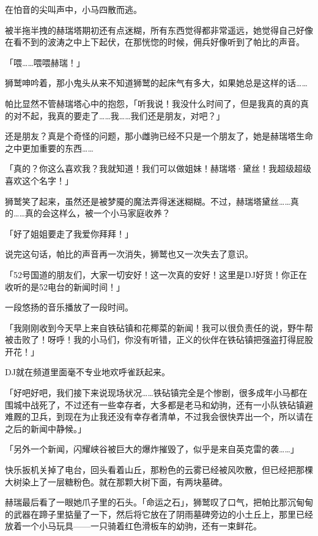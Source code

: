 在怕音的尖叫声中，小马四散而逃。

被半拖半拽的赫瑞塔期初还有点迷糊，所有东西觉得都非常遥远，她觉得自己好像在看不到的波涛之中上下起伏，在那恍惚的时候，佣兵好像听到了帕比的声音。

「喂……喂喂赫瑞！」

狮鹫呻吟着，那小鬼头从来不知道狮鹫的起床气有多大，如果她总是这样的话……{}

帕比显然不管赫瑞塔心中的抱怨，「听我说！我没什么时间了，但是我真的真的真的对不起，我真的要走了……我……我们还是朋友，对吧？」

还是朋友？真是个奇怪的问题，那小雌驹已经不只是一个朋友了，她是赫瑞塔生命之中更加重要的东西……

「真的？你这么喜欢我？我就知道！我们可以做姐妹！赫瑞塔·黛丝！我超级超级喜欢这个名字！」

狮鹫笑了起来，虽然还是被梦魇的魔法弄得迷迷糊糊。不过，赫瑞塔黛丝……真的……真的会这样么，被一个小马家庭收养？

「好了姐姐要走了我爱你拜拜！」

说完这句话，帕比的声音再一次消失，狮鹫也又一次失去了意识。

\horizonline


「{\rt 52号国道的朋友们，大家一切安好！这一次真的安好！这里是DJ好货！你正在收听的是52电台的新闻时间！}」

一段悠扬的音乐播放了一段时间。

「{\rt 我刚刚收到今天早上来自铁砧镇和花椰菜的新闻！我可以很负责任的说，野牛帮被击败了！呀呼！我的小马们，你没有听错，正义的伙伴在铁砧镇把强盗打得屁股开花！}」

DJ就在频道里面毫不专业地欢呼雀跃起来。

「{\rt 好吧好吧，我们接下来说现场状况……铁砧镇完全是个惨剧，很多成年小马都在围城中战死了，不过还有一些幸存者，大多都是老马和幼驹，还有一小队铁砧镇避难厩的卫兵，到现在为止我还没有幸存者清单，不过我会很快弄出一个，所以请在之后的新闻中静候。}」

「{\rt 另外一个新闻，闪耀峡谷被巨大的爆炸摧毁了，似乎是来自英克雷的袭……}」

快乐扳机关掉了电台，回头看着山丘，那粉色的云雾已经被风吹散，但已经把那棵大树染上了一层糖粉色。就在那颗大树下面，有两块墓碑。

赫瑞最后看了一眼她爪子里的石头。「命运之石」，狮鹫叹了口气，把帕比那沉甸甸的武器在蹄子里掂量了一下，然后将它放在了阴雨墓碑旁边的小土丘上，那里已经放着一个小马玩具——一只骑着红色滑板车的幼驹，还有一束鲜花。

